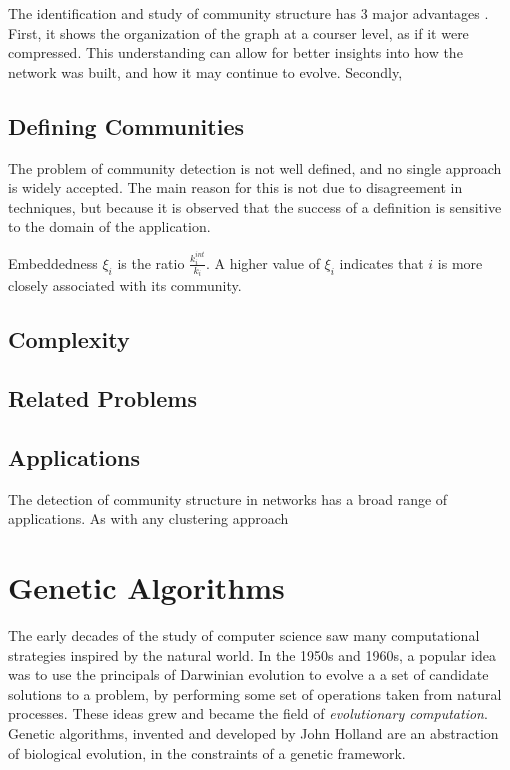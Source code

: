 The identification and study of community structure has 3 major advantages \cite{Lancichinetti2010}. First, it shows the organization of the graph at a courser level, as if it were compressed. This understanding can allow for better insights into how the network was built, and how it may continue to evolve. Secondly, 

\subsection{Defining Communities}

The problem of community detection is not well defined, and no single approach is widely accepted. The main reason for this is not due to disagreement in techniques, but because it is observed that the success of a definition is sensitive to the domain of the application. 

Embeddedness $\xi_i$ is the ratio $\frac{k^{int}_i}{k_i}$. A higher value of $\xi_i$ indicates that $i$ is more closely associated with its community.   


\subsection{Complexity}


\subsection{Related Problems}


\subsection{Applications}
The detection of community structure in networks has a broad range of applications. As with any clustering approach


\section{Genetic Algorithms}
The early decades of the study of computer science saw many computational strategies inspired by the natural world. In the 1950s and 1960s, a popular idea was to use the principals of Darwinian evolution to evolve a a set of candidate solutions to a problem, by performing some set of operations taken from natural processes. These ideas grew and became the field of \textit{evolutionary computation}. Genetic algorithms, invented and developed by John Holland \cite{holland1975adaptation} are an abstraction of biological evolution, in the constraints of a genetic framework. 

